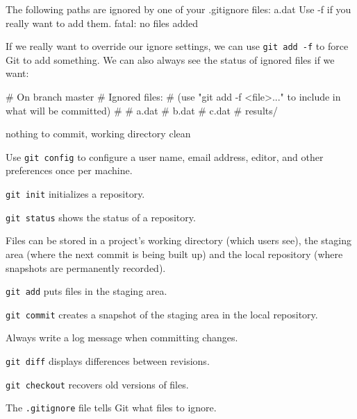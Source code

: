 \begin{VerbOut}
The following paths are ignored by one of your .gitignore files:
a.dat
Use -f if you really want to add them.
fatal: no files added
\end{VerbOut}

If we really want to override our ignore settings, we can use
\texttt{git add -f} to force Git to add something. We can also always
see the status of ignored files if we want:


\begin{VerbOut}
# On branch master
# Ignored files:
#  (use "git add -f <file>..." to include in what will be committed)
#
#        a.dat
#        b.dat
#        c.dat
#        results/

nothing to commit, working directory clean
\end{VerbOut}

\begin{keypoints}
\begin{swcitemize}
\item
  Use \texttt{git config} to configure a user name, email address,
  editor, and other preferences once per machine.
\item
  \texttt{git init} initializes a repository.
\item
  \texttt{git status} shows the status of a repository.
\item
  Files can be stored in a project's working directory (which users
  see), the staging area (where the next commit is being built up) and
  the local repository (where snapshots are permanently recorded).
\item
  \texttt{git add} puts files in the staging area.
\item
  \texttt{git commit} creates a snapshot of the staging area in the
  local repository.
\item
  Always write a log message when committing changes.
\item
  \texttt{git diff} displays differences between revisions.
\item
  \texttt{git checkout} recovers old versions of files.
\item
  The \texttt{.gitignore} file tells Git what files to ignore.
\end{swcitemize}
\end{keypoints}

